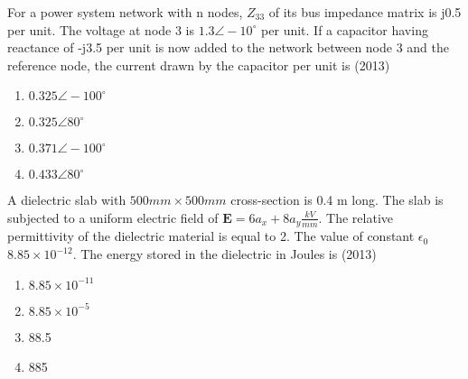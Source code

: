     \item For a power system network with n nodes, $Z_33$ of its bus impedance matrix is j0.5 per unit. The
    voltage at node 3 is $1.3\angle-10^{\circ}$ per unit. If a capacitor having reactance of -j3.5 per unit is now
    added to the network between node 3 and the reference node, the current drawn by the capacitor per
    unit is \hfill (2013)
    \begin{enumerate}[label=(\Alph*)]
        \item $0.325\angle-100^{\circ}$
        \item $0.325\angle80^{\circ}$
        \item $0.371\angle-100^{\circ}$
        \item $0.433\angle80^{\circ}$
    \end{enumerate}
    \item A dielectric slab with $500mm\times500 mm$ cross-section is 0.4 m long. The slab is subjected to a uniform
    electric field of $\mathbf{E}=6a_x + 8a_y \frac{kV}{mm}$. The relative permittivity of the dielectric material is equal to 2. The value of constant $\epsilon_0 $ $8.85\times 10^{-12}$. The energy stored in the dielectric in Joules is \hfill (2013)
    
    \begin{enumerate}[label=(\Alph*)]
        \item  $8.85\times 10^{-11}$ 
        \item $8.85\times 10^{-5}$ 
        \item  88.5
        \item  885 
    \end{enumerate} 
    
